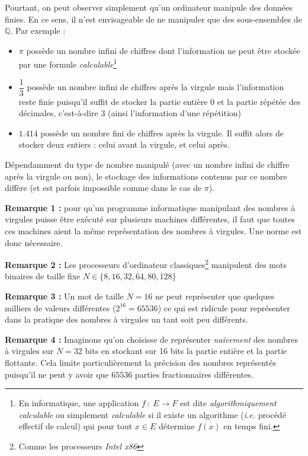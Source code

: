 \documentclass[../../main.tex]{subfiles}
\begin{document}
Pourtant, on peut observer simplement qu'un ordinateur manipule des données finies. En ce sens, il n'est envisageable de ne manipuler que des sous-ensembles de $\mathbb{Q}$. Par exemple :
\begin{itemize}
     \item $\pi$ possède un nombre infini de chiffres dont l'information ne peut être stockée par une formule \textit{calculable}\footnote{En informatique, une application $f\ :\ E \rightarrow F$ est dite \textit{algorithmiquement calculable} ou simplement \textit{calculable} si il existe un algorithme (\textit{i.e.} procédé effectif de calcul) qui pour tout $x\in E$ détermine $f(x)$ en temps fini.}
     \item $\dfrac{1}{3}$ possède un nombre infini de chiffres après la virgule mais l'information reste finie puisqu'il suffit de stocker la partie entière $0$ et la partie répétée des décimales, c'est-à-dire $3$ (ainsi l'information d'une répétition)
     \item $1.414$ possède un nombre fini de chiffres après la virgule. Il suffit alors de stocker deux entiers : celui avant la virgule, et celui après.
\end{itemize}
Dépendamment du type de nombre manipulé (avec un nombre infini de chiffre après la virgule ou non), le stockage des informations contenus par ce nombre diffère (et est parfois impossible comme dans le cas de $\pi$).

\textbf{Remarque 1 :} pour qu'un programme informatique manipulant des nombres à virgules puisse être exécuté sur plusieurs machines différentes, il faut que toutes ces machines aient la même représentation des nombres à virgules. Une norme est donc nécessaire.

\textbf{Remarque 2 :} Les processeurs d'ordinateur classiques\footnote{Comme les processeurs \textit{Intel x86}} manipulent des mots binaires de taille fixe $N\in\{8, 16, 32, 64, 80, 128\}$

\textbf{Remarque 3 :} Un mot de taille $N = 16$ ne peut représenter que quelques milliers de valeurs différentes ($2^{16} = 65536$) ce qui est ridicule pour représenter dans la pratique des nombres à virgules un tant soit peu différents.

\textbf{Remarque 4 :} Imaginons qu'on choisisse de représenter \textit{naïvement} des nombres à virgules sur $N = 32$ bits en stockant sur 16 bits la partie entière et la partie flottante. Cela limite particulièrement la précision des nombres représentés puisqu'il ne peut y avoir que $65536$ parties fractionnaires différentes.
\end{document}

